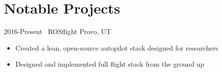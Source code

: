 
\section{Notable Projects}

\begin{entrylist}
\entry
{2016-Present}
{~ROSflight}
{Provo, UT}
{
\begin{itemize}
	\item Created a lean, open-source autopilot stack designed for researchers
	\item Designed and implemented full flight stack from the ground up
\end{itemize}
}
\end{entrylist}